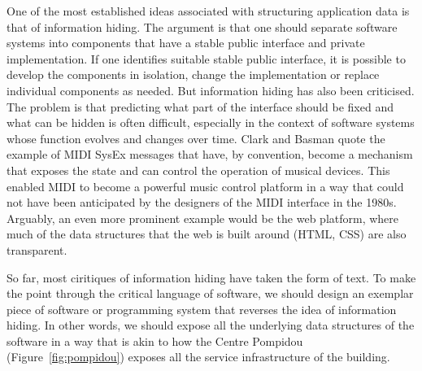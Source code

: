 One of the most established ideas associated with structuring application data is that of
information hiding.
The argument is that one should separate software systems into components that have a stable
public interface and private implementation. If one identifies suitable stable public interface,
it is possible to develop the components in isolation, change the implementation or replace
individual components as needed. But information hiding has also been criticised. The problem is
that predicting what part of the interface should be fixed and what can be hidden is often
difficult, especially in the context of software systems whose function evolves and changes
over time. Clark and Basman quote the example of MIDI SysEx messages that
have, by convention, become a mechanism that exposes the state and can control the operation
of musical devices. This enabled MIDI to become a powerful music control platform in a way
that could not have been anticipated by the designers of the MIDI interface in the 1980s.
Arguably, an even more prominent example would be the web platform, where much of the data
structures that the web is built around (HTML, CSS) are also transparent.

So far, most ciritiques of information hiding have taken the form of text. To make the point
through the critical language of software, we should design an exemplar piece of software
or programming system that reverses the idea of information hiding. In other words, we
should expose all the underlying data structures of the software in a way that is akin to how
the Centre Pompidou (Figure~\ref{fig:pompidou}) exposes all the service infrastructure of the
building.

